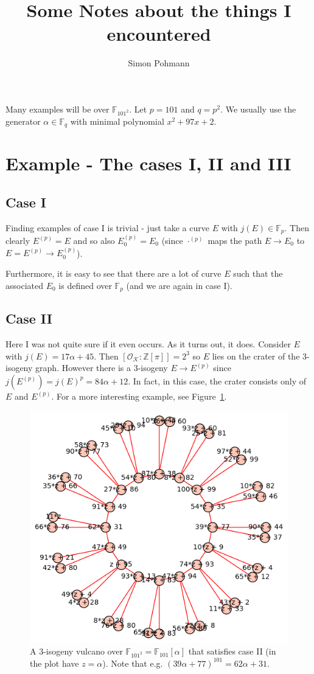 \documentclass{scrartcl}
\title{Some Notes about the things I encountered}
\author{Simon Pohmann}
\newcommand{\Z}{\mathbb{Z}}
\newcommand{\F}{\mathbb{F}}
\newcommand{\K}{\mathcal{K}}
\renewcommand{\O}{\mathcal{O}}
\theoremstyle{definition}
\begin{document}
\maketitle

Many examples will be over $\F_{101^2}$.
Let $p = 101$ and $q = p^2$.
We usually use the generator $\alpha \in \F_q$ with minimal polynomial $x^2 + 97 x + 2$.

\section{Example - The cases I, II and III}
\subsection{Case I}
Finding examples of case I is trivial - just take a curve $E$ with $j(E) \in \F_p$.
Then clearly $E^{(p)} = E$ and so also $E_0^{(p)} = E_0$ (since $\cdot^{(p)}$ maps the path $E \to E_0$ to $E = E^{(p)} \to E_0^{(p)}$).

Furthermore, it is easy to see that there are a lot of curve $E$ such that the associated $E_0$ is defined over $\F_p$ (and we are again in case I).

\subsection{Case II}
Here I was not quite sure if it even occurs. As it turns out, it does.
Consider $E$ with $j(E) = 17\alpha + 45$.
Then $[\O_\K : \Z[\pi]] = 2^3$ so $E$ lies on the crater of the 3-isogeny graph.
However there is a 3-isogeny $E \to E^{(p)}$ since $j(E^{(p)}) = j(E)^p = 84 \alpha + 12$.
In fact, in this case, the crater consists only of $E$ and $E^{(p)}$.
For a more interesting example, see Figure~\ref{fig:example_II}.
\begin{figure}
    \includegraphics{./example_II.png}
    \caption{\label{fig:example_II} A 3-isogeny vulcano over $\F_{101^2} = \F_{101}[\alpha]$ that satisfies case II (in the plot have $z = \alpha$). Note that e.g. $(39\alpha + 77)^{101} = 62\alpha + 31$.}
\end{figure}
\end{document}
